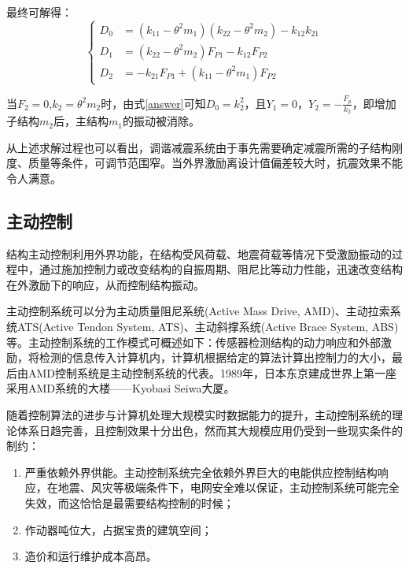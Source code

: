 \begin{enumerate}
最终可解得：
\begin{equation}
\label{answer}
\left\{
\begin{array}{rl}
D_0&=\left(k_{11}-\theta^2m_1\right)\left(k_{22}-\theta^2m_2\right)-k_{12}k_{21} \\
D_1&=\left(k_{22}-\theta^2m_2\right)F_{P1}-k_{12}F_{P2} \\
D_2&=-k_{21}F_{P1}+\left(k_{11}-\theta^2m_1\right)F_{P2}
\end{array}
\right.
\end{equation}

当$F_2=0$,$k_2=\theta^2m_2$时，由式\eqref{answer}可知$D_0=k_2^2$，且$Y_1=0$，$Y_2=-\frac{F_p}{k_2}$，即增加子结构$m_2$后，主结构$m_1$的振动被消除。

从上述求解过程也可以看出，调谐减震系统由于事先需要确定减震所需的子结构刚度、质量等条件，可调节范围窄。当外界激励离设计值偏差较大时，抗震效果不能令人满意。
\end{enumerate}


\subsection{主动控制}
结构主动控制利用外界功能，在结构受风荷载、地震荷载等情况下受激励振动的过程中，通过施加控制力或改变结构的自振周期、阻尼比等动力性能，迅速改变结构在外激励下的响应，从而控制结构振动。

主动控制系统可以分为主动质量阻尼系统(Active Mass Drive, AMD)、主动拉索系统ATS(Active Tendon System, ATS)、主动斜撑系统(Active Brace System, ABS)等。主动控制系统的工作模式可概述如下：传感器检测结构的动力响应和外部激励，将检测的信息传入计算机内，计算机根据给定的算法计算出控制力的大小，最后由AMD控制系统是主动控制系统的代表。1989年，日本东京建成世界上第一座采用AMD系统的大楼——Kyobasi Seiwa大厦\cite{T.KoboriN.KoshikaN.Yamada1991}。

随着控制算法的进步与计算机处理大规模实时数据能力的提升，主动控制系统的理论体系日趋完善，且控制效果十分出色，然而其大规模应用仍受到一些现实条件的制约：
\begin{enumerate}
\item 严重依赖外界供能。主动控制系统完全依赖外界巨大的电能供应控制结构响应，在地震、风灾等极端条件下，电网安全难以保证，主动控制系统可能完全失效，而这恰恰是最需要结构控制的时候；
\item 作动器吨位大，占据宝贵的建筑空间\cite{lou2013}；
\item 造价和运行维护成本高昂。
\end{enumerate}

